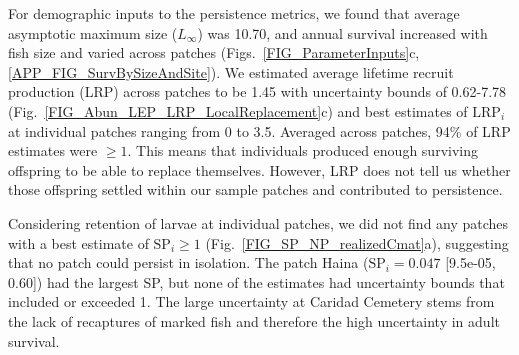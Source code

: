 \documentclass[12pt, oneside]{article}   	%
\begin{document}

For demographic inputs to the persistence metrics, we found that average asymptotic maximum size ($L_\infty$) was 10.70, and annual survival increased with fish size and varied across patches (Figs.\ \ref{FIG_ParameterInputs}c, \ref{APP_FIG_SurvBySizeAndSite}). We estimated average lifetime recruit production (LRP) across patches to be 1.45 with uncertainty bounds of 0.62-7.78 (Fig.\ \ref{FIG_Abun_LEP_LRP_LocalReplacement}c) and best estimates of $\text{LRP}_{i}$ at individual patches ranging from 0 to 3.5. Averaged across patches, 94\% of LRP estimates were $\geq 1$. This means that individuals produced enough surviving offspring to be able to replace themselves. However, LRP does not tell us whether those offspring settled within our sample patches and contributed to persistence. 

Considering retention of larvae at individual patches, we did not find any patches with a best estimate of $\text{SP}_{i} \geq 1$ (Fig.\ \ref{FIG_SP_NP_realizedCmat}a), suggesting that no patch could persist in isolation. The patch Haina ($\text{SP}_i = 0.047$ [9.5e-05, 0.60]) had the largest SP, but none of the estimates had uncertainty bounds that included or exceeded 1. The large uncertainty at Caridad Cemetery stems from the lack of recaptures of marked fish and therefore the high uncertainty in adult survival.
\end{document}
